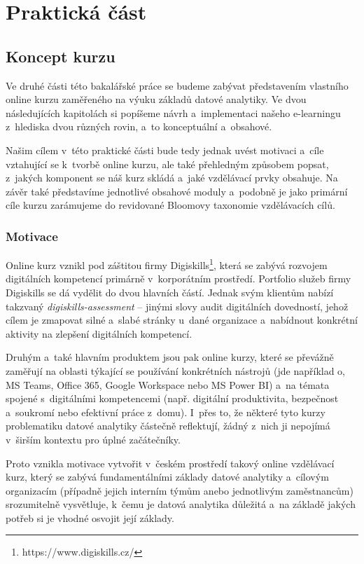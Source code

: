 \part{Praktická část}

\hypertarget{koncept-kurzu}{%
\chapter{Koncept kurzu}\label{koncept-kurzu}}

Ve druhé části této bakalářské práce se budeme zabývat představením vlastního online kurzu zaměřeného na výuku základů datové analytiky. Ve dvou následujících kapitolách si popíšeme návrh a~implementaci našeho e-learningu z~hlediska dvou různých rovin, a~to konceptuální a~obsahové.

Našim cílem v~této praktické části bude tedy jednak uvést motivaci a~cíle vztahující se k~tvorbě online kurzu, ale také přehledným způsobem popsat, z~jakých komponent se náš kurz skládá a~jaké vzdělávací prvky obsahuje. Na závěr také představíme jednotlivé obsahové moduly a~podobně je jako primární cíle kurzu zarámujeme do revidované Bloomovy taxonomie vzdělávacích cílů.

\hypertarget{motivace}{%
\section{Motivace}\label{motivace}}

Online kurz vznikl pod záštitou firmy Digiskills\footnote{https://www.digiskills.cz/}, která se zabývá rozvojem digitálních kompetencí primárně v~korporátním prostředí. Portfolio služeb firmy Digiskills se dá vydělit do dvou hlavních částí. Jednak svým klientům nabízí takzvaný \emph{digiskills-assessment} -- jinými slovy audit digitálních dovedností, jehož cílem je zmapovat silné a~slabé stránky u~dané organizace a~nabídnout konkrétní aktivity na zlepšení digitálních kompetencí.

Druhým a~také hlavním produktem jsou pak online kurzy, které se převážně zaměřují na oblasti týkající se používání konkrétních nástrojů (jde například o, MS Teams, Office 365, Google Workspace nebo MS Power BI) a~na témata spojené s~digitálními kompetencemi (např. digitální produktivita, bezpečnost a~soukromí nebo efektivní práce z~domu). I~přes to, že některé tyto kurzy problematiku datové analytiky částečně reflektují, žádný z~nich ji nepojímá v~širším kontextu pro úplné začátečníky.

Proto vznikla motivace vytvořit v~českém prostředí takový online vzdělávací kurz, který se zabývá fundamentálními základy datové analytiky a~cílovým organizacím (případně jejich interním týmům anebo jednotlivým zaměstnancům) srozumitelně vysvětluje, k~čemu je datová analytika důležitá a~na základě jakých potřeb si je vhodné osvojit její základy.

